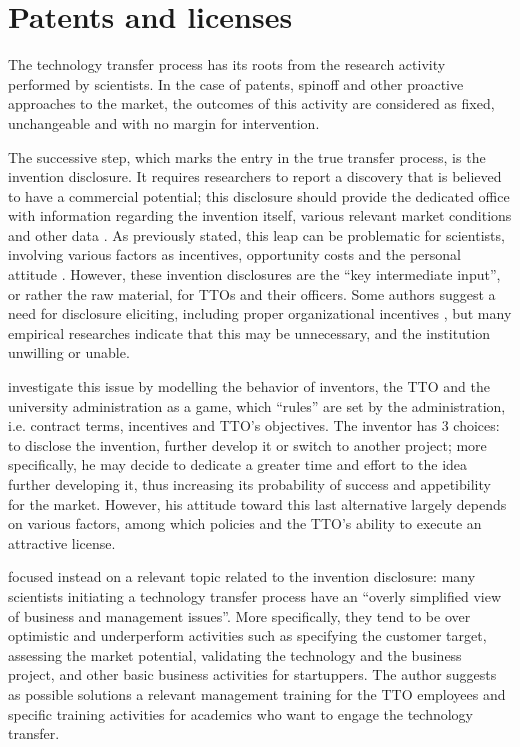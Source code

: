\section{Patents and licenses}

The technology transfer process has its roots from the research activity performed by scientists. In the case of patents, spinoff and other proactive approaches to the market, the outcomes of this activity are considered as fixed, unchangeable and with no margin for intervention. 

The successive step, which marks the entry in the true transfer process, is the invention disclosure. It requires researchers to report a discovery that is believed to have a commercial potential; this disclosure should provide the dedicated office with information regarding the invention itself, various relevant market conditions and other data \citep{Thursby2002}. As previously stated, this leap can be problematic for scientists, involving various factors as incentives, opportunity costs and the personal attitude \citep{OwenSmith2001}. However, these invention disclosures are the \enquote{key intermediate input}, or rather the raw material, for TTOs and their officers. Some authors suggest a need for disclosure eliciting, including proper organizational incentives \citep{Siegel2003a}, but many empirical researches indicate that this may be unnecessary, and the institution unwilling or unable. 

\citet{Jensen2003} investigate this issue by modelling the behavior of inventors, the TTO and the university administration as a game, which \enquote{rules} are set by the administration, i.e. contract terms, incentives and TTO's objectives. The inventor has 3 choices: to disclose the invention, further develop it or switch to another project; more specifically, he may decide to dedicate a greater time and effort to the idea further developing it, thus increasing its probability of success and appetibility for the market. However, his attitude toward this last alternative largely depends on various factors, among which policies and the TTO's ability to execute an attractive license.

\citet{McAdam2005} focused instead on a relevant topic related to the invention disclosure: many scientists initiating a technology transfer process have an \enquote{overly simplified view of business and management issues}. More specifically, they tend to be over optimistic and underperform activities such as specifying the customer target, assessing the market potential, validating the technology and the business project, and other basic business activities for startuppers. The author suggests as possible solutions a relevant management training for the TTO employees and specific training activities for academics who want to engage the technology transfer.

